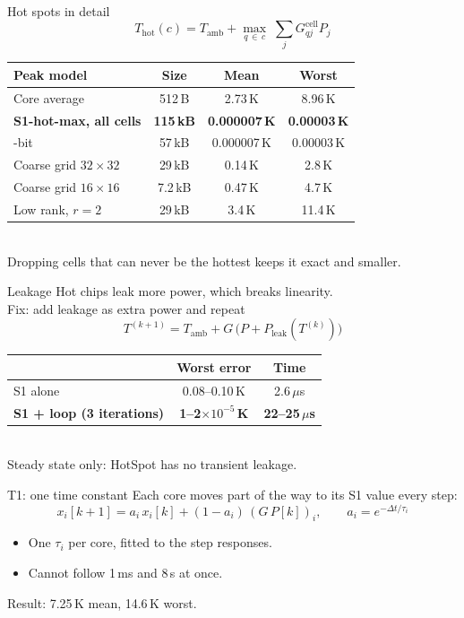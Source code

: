 \documentclass[aspectratio=169,14pt]{beamer}
\newcommand{\sub}[1]{{\color{muted}\small #1}}
\newcommand{\us}{\,$\mu$s}
\begin{document}
\begin{frame}[label=b-hot]{Hot spots in detail}
  \[
    T_\text{hot}(c) = T_\text{amb} + \max_{q\,\in\,c}\; \sum_j G^\text{cell}_{qj} P_j
  \]
  \centering\small
  \begin{tabular}{@{}l c c c@{}}
    \toprule
    Peak model & Size & Mean & Worst \\
    \midrule
    Core average & 512\,B & 2.73\,K & 8.96\,K \\
    \textbf{S1-hot-max, all cells} & \textbf{115\,kB} & \textbf{0.000007\,K} & \textbf{0.00003\,K} \\
    \quad 32-bit & 57\,kB & 0.000007\,K & 0.00003\,K \\
    Coarse grid $32\times32$ & 29\,kB & 0.14\,K & 2.8\,K \\
    Coarse grid $16\times16$ & 7.2\,kB & 0.47\,K & 4.7\,K \\
    Low rank, $r=2$ & 29\,kB & 3.4\,K & 11.4\,K \\
    \bottomrule
  \end{tabular}\\[0.3em]
  Dropping cells that can never be the hottest keeps it exact and smaller.
\end{frame}

\begin{frame}[label=b-leak]{Leakage}
  Hot chips leak more power, which breaks linearity.\\[0.4em]
  Fix: add leakage as extra power and repeat
  \[
    T^{(k+1)} = T_\text{amb} + G\,\bigl(P + P_\text{leak}(T^{(k)})\bigr)
  \]
  \centering\small
  \begin{tabular}{@{}l c c@{}}
    \toprule
    & Worst error & Time \\
    \midrule
    S1 alone & 0.08--0.10\,K & 2.6\us \\
    \textbf{S1 + loop (3 iterations)} & \textbf{1--2$\times10^{-5}$\,K} & \textbf{22--25\us} \\
    \bottomrule
  \end{tabular}\\[0.4em]
  \normalsize\sub{Steady state only: HotSpot has no transient leakage.}
\end{frame}

\begin{frame}[label=b-t1]{T1: one time constant}
  Each core moves part of the way to its S1 value every step:
  \[
    x_i[k+1] = a_i\, x_i[k] + (1-a_i)\,(G\,P[k])_i,
    \qquad a_i = e^{-\Delta t/\tau_i}
  \]
  \begin{itemize}
    \item One $\tau_i$ per core, fitted to the step responses.
    \item Cannot follow 1\,ms and 8\,s at once.
  \end{itemize}
  \vspace{0.4em}
  \centering Result: \alert{7.25\,K} mean, 14.6\,K worst.
\end{frame}
\end{document}
